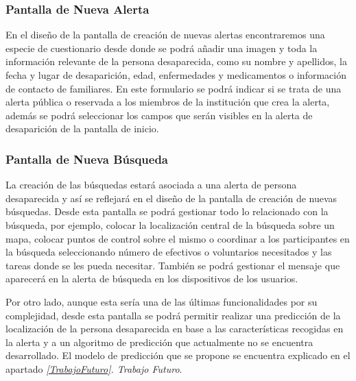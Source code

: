 
    \subsubsection{Pantalla de Nueva Alerta}
    En el diseño de la pantalla de creación de nuevas alertas encontraremos una especie de cuestionario desde donde se podrá añadir una imagen y toda la información relevante de la persona desaparecida, como su nombre y apellidos, la fecha y lugar de desaparición, edad, enfermedades y medicamentos o información de contacto de familiares. En este formulario se podrá indicar si se trata de una alerta pública o reservada a los miembros de la institución que crea la alerta, además se podrá seleccionar los campos que serán visibles en la alerta de desaparición de la pantalla de inicio. 
    


    \vspace{3cm}


    \subsubsection{Pantalla de Nueva Búsqueda}
    La creación de las búsquedas estará asociada a una alerta de persona desaparecida y así se reflejará en el diseño de la pantalla de creación de nuevas búsquedas. Desde esta pantalla se podrá gestionar todo lo relacionado con la búsqueda, por ejemplo, colocar la localización central de la búsqueda sobre un mapa, colocar puntos de control sobre el mismo o coordinar a los participantes en la búsqueda seleccionando número de efectivos o voluntarios necesitados y las tareas donde se les pueda necesitar. También se podrá gestionar el mensaje que aparecerá en la alerta de búsqueda en los dispositivos de los usuarios. 

    Por otro lado, aunque esta sería una de las últimas funcionalidades por su complejidad, desde esta pantalla se podrá permitir realizar una predicción de la localización de la persona desaparecida en base a las características recogidas en la alerta y a un algoritmo de predicción que actualmente no se encuentra desarrollado. El modelo de predicción que se propone se encuentra explicado en el apartado \textit{\ref{TrabajoFuturo}. Trabajo Futuro}.
    
